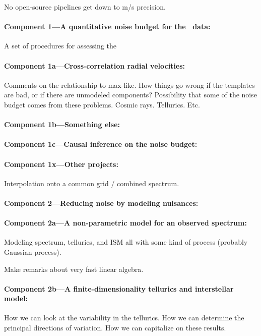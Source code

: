 \documentclass[12pt, fullpage, letterpaper]{article}
\begin{document}
No open-source pipelines get down to m/s precision.

\paragraph{Component 1---A quantitative noise budget for the \HARPS\ data:}
A set of procedures for assessing the 

\paragraph{Component 1a---Cross-correlation radial velocities:}
Comments on the relationship to max-like. How things go wrong
if the templates are bad, or if there are unmodeled components?
Possibility that some of the noise budget comes from these
problems. Cosmic rays. Tellurics. Etc.

\paragraph{Component 1b---Something else:}

\paragraph{Component 1c---Causal inference on the noise budget:}

\paragraph{Component 1x---Other projects:}
Interpolation onto a common grid / combined spectrum.

\paragraph{Component 2---Reducing noise by modeling nuisances:}

\paragraph{Component 2a---A non-parametric model for an observed spectrum:}
Modeling spectrum, tellurics, and ISM all with some kind of
process (probably Gaussian process).

Make remarks about very fast linear algebra.

\paragraph{Component 2b---A finite-dimensionality tellurics and interstellar model:}
How we can look at the variability in the tellurics.
How we can determine the principal directions of variation.
How we can capitalize on these results.
\end{document}
